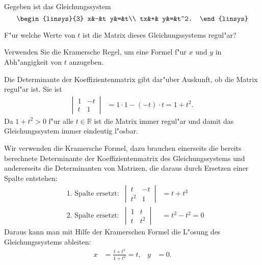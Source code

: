 Gegeben ist das Gleichungssystem
\[
\begin{linsys}{3}
 x&-&t y&=&t\\
tx&+&  y&=&t^2.
\end{linsys}
\]
\begin{teilaufgaben}
\item F"ur welche Werte von $t$ ist die Matrix dieses Gleichungssystems
regul"ar?
\item
Verwenden Sie die Kramersche Regel, um 
eine Formel f"ur $x$ und $y$ in Abh"angigkeit von $t$ anzugeben.
\end{teilaufgaben}

\begin{loesung}
\begin{teilaufgaben}
\item
Die Determinante der Koeffizientenmatrix gibt dar"uber Auskunft, ob die
Matrix regul"ar ist. Sie ist
\begin{align*}
\left|\,\begin{matrix}1&-t\\t&1\end{matrix}\,\right|
&=1\cdot 1-(-t)\cdot t=1+t^2.
\end{align*}
Da $1+t^2>0$ f"ur alle $t\in\mathbb R$ ist die Matrix immer regul"ar und
damit das Gleichungssystem immer eindeutig l"osbar.
\item
Wir verwenden die Kramersche Formel, dazu brauchen einerseits die bereits
berechnete Determinante der Koeffizientenmatrix des Gleichungssystems
und andererseits die Determinanten von Matrizen, die daraus durch Ersetzen
einer Spalte entstehen:
\begin{align*}
&\text{1.~Spalte ersetzt:}&
\left|\,\begin{matrix}t&-t\\t^2&1\end{matrix}\,\right|
&=t+t^3
\\
&\text{2.~Spalte ersetzt:}&
\left|\,\begin{matrix}1&t\\t&t^2\end{matrix}\,\right|
&=t^2-t^2=0
\end{align*}
Daraus kann man mit Hilfe der Kramerschen Formel die L"osung des
Gleichungssystems ableiten:
\begin{align*}
x&=\frac{t+t^3}{1+t^2}=t,&
y&=0.
\end{align*}
\end{teilaufgaben}
\end{loesung}
